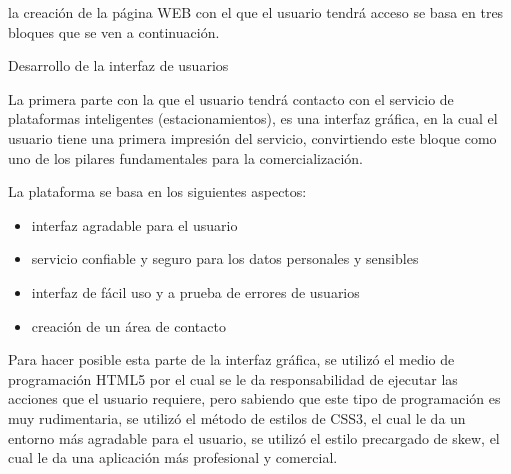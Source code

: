 \documentclass[12pt]{article}
\begin{document}
\vspace{\baselineskip}
la creación de la página WEB con el que el usuario tendrá acceso se basa en tres bloques que se ven a continuación.\par


\vspace{\baselineskip}
Desarrollo de la interfaz de usuarios\par


\vspace{\baselineskip}
La primera parte con la que el usuario tendrá contacto con el servicio de plataformas inteligentes (estacionamientos), es una interfaz gráfica, en la cual el usuario tiene una primera impresión del servicio, convirtiendo este bloque como uno de los pilares fundamentales para la comercialización.\par

La plataforma se basa en los siguientes aspectos:\par


\vspace{\baselineskip}
\begin{itemize}
	\item interfaz agradable para el usuario\par

	\item servicio confiable y seguro para los datos personales y sensibles\par

	\item interfaz de fácil uso y a prueba de errores de usuarios\par

	\item creación de un área de contacto
\end{itemize}\par

Para hacer posible esta parte de la interfaz gráfica, se utilizó el medio de programación HTML5 por el cual se le da responsabilidad de ejecutar las acciones que el usuario requiere, pero sabiendo que este tipo de programación es muy rudimentaria, se utilizó el método de estilos de CSS3, el cual le da un entorno más agradable para el usuario, se utilizó el estilo precargado de skew, el cual le da una aplicación más profesional y comercial.\par




\end{document}
